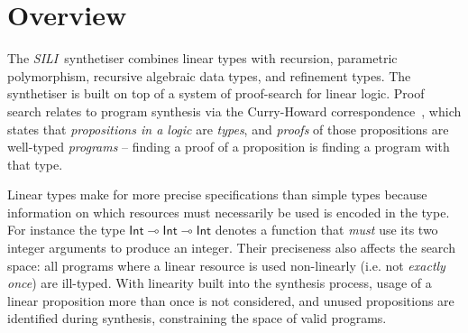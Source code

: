 \documentclass{llncs}
\newcommand{\lolli}{\multimap}
\newcommand{\mypara}[1]{\paragraph{\textbf{#1}.}}
\newcommand{\synname}{\emph{SILI}}
\begin{document}



\section{Overview}\label{sec:overview}

The \synname\ synthetiser combines linear types with recursion,
parametric polymorphism, recursive algebraic data types, and
refinement types. The synthetiser is built on top of a system of proof-search for
linear logic. Proof search relates to program synthesis via the Curry-Howard
correspondence~\cite{}, which states that \emph{propositions in a logic} are
\emph{types}, and \emph{proofs} of those propositions are well-typed
\emph{programs} -- finding a proof of a proposition is finding a program with
that type.

Linear types make for more precise specifications than simple types
because information on which resources must necessarily be used is
encoded in the type. For instance the type $\mathsf{Int} \lolli
\mathsf{Int} \lolli \mathsf{Int}$ denotes a function that \emph{must}
use its two integer arguments to produce an integer.
Their preciseness also affects the search space:
all programs where a linear resource is used non-linearly (i.e. not
\emph{exactly once}) are ill-typed. With linearity built into the
synthesis process, usage of a linear proposition more than once is not
considered, and unused propositions are identified during synthesis,
constraining the space of valid programs.  %
\end{document}
